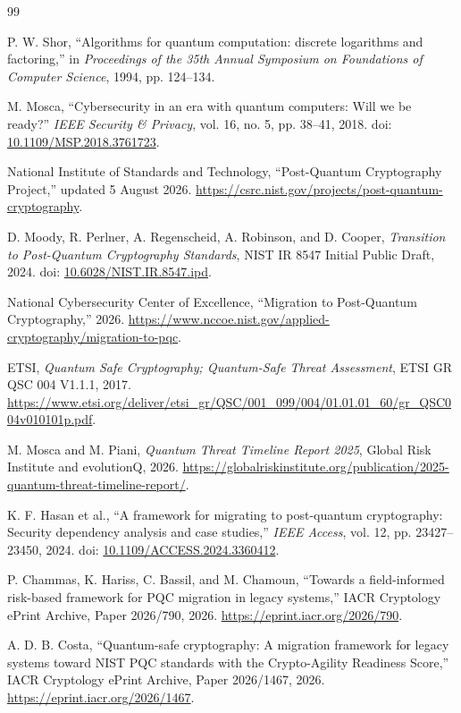 \documentclass[10pt]{article}
\begin{document}
\begin{thebibliography}{99}
\small

P. W. Shor, ``Algorithms for quantum computation: discrete logarithms and factoring,'' in \emph{Proceedings of the 35th Annual Symposium on Foundations of Computer Science}, 1994, pp. 124--134.

M. Mosca, ``Cybersecurity in an era with quantum computers: Will we be ready?'' \emph{IEEE Security \& Privacy}, vol. 16, no. 5, pp. 38--41, 2018. doi: \href{https://doi.org/10.1109/MSP.2018.3761723}{10.1109/MSP.2018.3761723}.

National Institute of Standards and Technology, ``Post-Quantum Cryptography Project,'' updated 5 August 2026. \url{https://csrc.nist.gov/projects/post-quantum-cryptography}.

D. Moody, R. Perlner, A. Regenscheid, A. Robinson, and D. Cooper, \emph{Transition to Post-Quantum Cryptography Standards}, NIST IR 8547 Initial Public Draft, 2024. doi: \href{https://doi.org/10.6028/NIST.IR.8547.ipd}{10.6028/NIST.IR.8547.ipd}.

National Cybersecurity Center of Excellence, ``Migration to Post-Quantum Cryptography,'' 2026. \url{https://www.nccoe.nist.gov/applied-cryptography/migration-to-pqc}.

ETSI, \emph{Quantum Safe Cryptography; Quantum-Safe Threat Assessment}, ETSI GR QSC 004 V1.1.1, 2017. \url{https://www.etsi.org/deliver/etsi_gr/QSC/001_099/004/01.01.01_60/gr_QSC004v010101p.pdf}.

M. Mosca and M. Piani, \emph{Quantum Threat Timeline Report 2025}, Global Risk Institute and evolutionQ, 2026. \url{https://globalriskinstitute.org/publication/2025-quantum-threat-timeline-report/}.

K. F. Hasan et al., ``A framework for migrating to post-quantum cryptography: Security dependency analysis and case studies,'' \emph{IEEE Access}, vol. 12, pp. 23427--23450, 2024. doi: \href{https://doi.org/10.1109/ACCESS.2024.3360412}{10.1109/ACCESS.2024.3360412}.

P. Chammas, K. Hariss, C. Bassil, and M. Chamoun, ``Towards a field-informed risk-based framework for PQC migration in legacy systems,'' IACR Cryptology ePrint Archive, Paper 2026/790, 2026. \url{https://eprint.iacr.org/2026/790}.

A. D. B. Costa, ``Quantum-safe cryptography: A migration framework for legacy systems toward NIST PQC standards with the Crypto-Agility Readiness Score,'' IACR Cryptology ePrint Archive, Paper 2026/1467, 2026. \url{https://eprint.iacr.org/2026/1467}.


\end{thebibliography}
\end{document}
